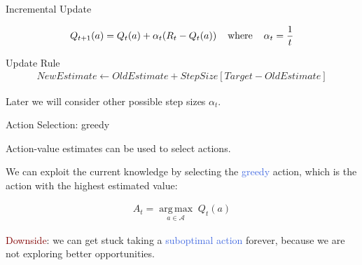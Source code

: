 \documentclass{beamer}
\DeclareMathOperator*{\argmax}{arg\,max}
\begin{document}
\begin{frame}{Incremental Update}

\begin{align*}
	Q_{t+1}(a) = Q_t(a) + \alpha_t ( R_t - Q_t(a)) \hspace{4mm} \text{where} \hspace{4mm} \alpha_t = \frac{1}{t}
\end{align*}


\begin{block}{Update Rule}		
\begin{align*}
    NewEstimate \leftarrow OldEstimate + StepSize [Target - OldEstimate]
\end{align*}\end{block}


\vspace{4mm}

Later we will consider other possible step sizes $\alpha_t$.

\end{frame}

\begin{frame}{Action Selection: greedy}

Action-value estimates can be used to select actions. 

\vspace{4mm}

We can exploit the current knowledge by selecting the \textcolor{RoyalBlue}{greedy} action, which is the action with the highest estimated value:


\begin{align*}
A_{t} =\underset{a \in \mathcal{A}}{\argmax} \; Q_t(a)
\end{align*}

\textcolor{Maroon}{Downside}: we can get stuck taking a \textcolor{RoyalBlue}{suboptimal action} forever, because we are not exploring better opportunities.

\end{frame}
\end{document}

